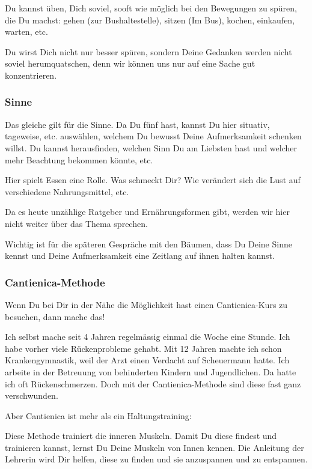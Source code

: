 \documentclass[11pt,titlepage,a5paper]{book}
\begin{document}
Du kannst üben, Dich soviel, sooft wie möglich bei den Bewegungen zu spüren, die Du machst: gehen (zur Bushaltestelle), sitzen (Im Bus), kochen, einkaufen, warten, etc.

Du wirst Dich nicht nur besser spüren, sondern Deine Gedanken werden nicht soviel herumquatschen, denn wir können uns nur auf eine Sache gut konzentrieren.

\subsubsection{Sinne}

Das gleiche gilt für die Sinne. Da Du fünf hast, kannst Du hier situativ, tageweise, etc. auswählen, welchem Du bewusst Deine Aufmerksamkeit schenken willst. Du kannst herausfinden, welchen Sinn Du am Liebsten hast und welcher mehr Beachtung bekommen könnte, etc. 

Hier spielt Essen eine Rolle.
Was schmeckt Dir? Wie verändert sich die Lust auf verschiedene Nahrungsmittel, etc.

Da es heute unzählige Ratgeber und Ernährungsformen gibt, werden wir hier nicht weiter über das Thema sprechen.

Wichtig ist für die späteren Gespräche mit den Bäumen, dass Du Deine Sinne kennst und Deine Aufmerksamkeit eine Zeitlang auf ihnen halten kannst.

\subsubsection{Cantienica-Methode}

Wenn Du bei Dir in der Nähe die Möglichkeit hast einen Cantienica-Kurs zu besuchen, dann mache das! 

Ich selbst mache seit 4 Jahren regelmässig einmal die Woche eine Stunde. Ich habe vorher viele Rückenprobleme gehabt. Mit 12 Jahren machte ich schon Krankengymnastik, weil der Arzt einen Verdacht auf Scheuermann hatte. Ich arbeite in der Betreuung von behinderten Kindern und Jugendlichen. Da hatte ich oft Rückenschmerzen. Doch mit der Cantienica-Methode sind diese fast ganz verschwunden.

Aber Cantienica ist mehr als ein Haltungstraining:

Diese Methode trainiert die inneren Muskeln. Damit Du diese findest und trainieren kannst, lernst Du Deine Muskeln von Innen kennen. Die Anleitung der Lehrerin wird Dir helfen, diese zu finden und sie anzuspannen und zu entspannen.
\end{document}
